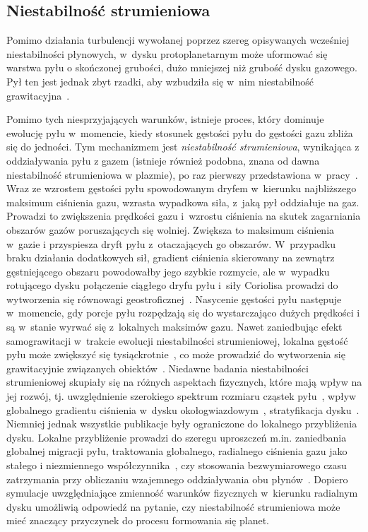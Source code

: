 \subsection{Niestabilność strumieniowa}
Pomimo działania turbulencji wywołanej poprzez szereg opisywanych wcześniej
niestabilności płynowych, w~dysku protoplanetarnym może uformować się warstwa
pyłu o skończonej grubości, dużo mniejszej niż grubość dysku gazowego. Pył ten
jest jednak zbyt rzadki, aby wzbudziła się w~nim niestabilność
grawitacyjna~\cite{JK05,JHK06}.
%
\par Pomimo tych niesprzyjających warunków, istnieje proces, który dominuje
ewolucję pyłu w~momencie, kiedy stosunek gęstości pyłu do gęstości gazu zbliża
się do jedności. Tym mechanizmem jest {\it niestabilność strumieniowa}, 
wynikająca z oddziaływania pyłu z gazem (istnieje  również podobna, znana od
dawna  niestabilność strumieniowa w plazmie),
po raz pierwszy przedstawiona w~pracy~\cite{YG05}.  Wraz ze wzrostem gęstości pyłu
spowodowanym dryfem w~kierunku najbliższego maksimum ciśnienia gazu,
wzrasta wypadkowa siła, z~jaką pył oddziałuje na gaz.  Prowadzi to zwiększenia
prędkości gazu i~wzrostu ciśnienia na skutek zagarniania obszarów gazów
poruszających się wolniej. Zwiększa to maksimum ciśnienia w~gazie i przyspiesza
dryft pyłu z~otaczających go obszarów. W~przypadku braku działania dodatkowych
sił, gradient ciśnienia skierowany na zewnątrz gęstniejącego obszaru powodowałby
jego szybkie rozmycie, ale w~wypadku rotującego dysku połączenie ciągłego dryfu
pyłu i~siły Coriolisa prowadzi do wytworzenia się równowagi
geostroficznej~\cite{JBL11}. Nasycenie gęstości pyłu następuje w~momencie, gdy
porcje pyłu rozpędzają się do wystarczająco dużych prędkości i są w~stanie
wyrwać się z~lokalnych maksimów gazu. Nawet zaniedbując efekt samograwitacji
w~trakcie ewolucji niestabilności strumieniowej, lokalna gęstość pyłu może
zwiększyć się tysiąckrotnie~\cite{JY07}, co może prowadzić do wytworzenia się
grawitacyjnie związanych obiektów~\cite{J07}.  Niedawne badania niestabilności
strumieniowej skupiały się na różnych aspektach fizycznych, które mają wpływ na
jej rozwój, tj. uwzględnienie szerokiego spektrum rozmiaru cząstek
pyłu~\cite{BS10a}, wpływ globalnego gradientu ciśnienia w~dysku
okołogwiazdowym~\cite{BS10b}, stratyfikacja dysku~\cite{T12}.  Niemniej jednak
wszystkie publikacje były ograniczone do lokalnego przybliżenia dysku.  Lokalne
przybliżenie prowadzi do szeregu uproszczeń m.in. zaniedbania globalnej migracji
pyłu, traktowania globalnego, radialnego ciśnienia gazu jako stałego i
niezmiennego współczynnika~\cite{N86}, czy stosowania bezwymiarowego czasu
zatrzymania przy obliczaniu wzajemnego oddziaływania obu płynów~\cite{YG05}.
Dopiero symulacje uwzględniające zmienność warunków fizycznych w~kierunku
radialnym dysku umożliwią odpowiedź na pytanie, czy niestabilność strumieniowa
może mieć znaczący przyczynek do procesu formowania się planet.


